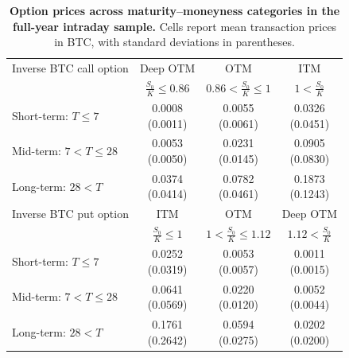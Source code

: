 \documentclass[11pt]{article}
\begin{document}
\begin{table}[h]
\centering

\begin{tabular}{lccc}
\hline
Inverse BTC call option & Deep OTM & OTM & ITM  \\
 & $\frac{S_0}{K} \leq 0.86$ & $0.86 < \frac{S_0}{K} \leq 1$ & $1 < \frac{S_0}{K}$  \\
\hline
Short-term: $T \leq 7$ & \makecell{0.0008\\(0.0011)} & \makecell{0.0055\\(0.0061)} & \makecell{0.0326\\(0.0451)} \\
Mid-term: $7 < T \leq 28$ & \makecell{0.0053\\(0.0050)} & \makecell{0.0231\\(0.0145)} & \makecell{0.0905\\(0.0830)} \\
Long-term: $28 < T$ & \makecell{0.0374\\(0.0414)} & \makecell{0.0782\\(0.0461)} & \makecell{0.1873\\(0.1243)} \\
\hline
Inverse BTC put option & ITM & OTM & Deep OTM \\
 & $\frac{S_0}{K} \leq 1$ & $1 < \frac{S_0}{K} \leq 1.12$ &  $1.12 < \frac{S_0}{K}$ \\
\hline
Short-term: $T \leq 7$ & \makecell{0.0252\\(0.0319)} & \makecell{0.0053\\(0.0057)} & \makecell{0.0011\\(0.0015)} \\
Mid-term: $7 < T \leq 28$ & \makecell{0.0641\\(0.0569)} & \makecell{0.0220\\(0.0120)} & \makecell{0.0052\\(0.0044)} \\
Long-term: $28 < T$ & \makecell{0.1761\\(0.2642)} & \makecell{0.0594\\(0.0275)} & \makecell{0.0202\\(0.0200)} \\
\hline
\end{tabular}
\caption{\textbf{Option prices across maturity--moneyness categories in the full-year intraday sample.} Cells report mean transaction prices in BTC, with standard deviations in parentheses.}
\label{tab:appendix_full_year_option_prices}
\end{table}
\end{document}

